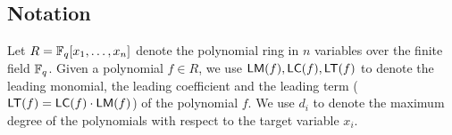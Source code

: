 
\subsection{Notation}

Let \(R = \mathbb{F}_q[x_1, \dots, x_n]\) denote the polynomial ring in \(n\) variables over the finite field \(\mathbb{F}_q\). Given a polynomial \(f \in R\), we use \(\mathsf{LM}(f), \mathsf{LC}(f), \mathsf{LT}(f)\) to denote the leading monomial, the leading coefficient and the leading term (\(\mathsf{LT}(f) = \mathsf{LC}(f)\cdot \mathsf{LM}(f)\)) of the polynomial \(f\). We use $d_i$ to denote the maximum degree of the polynomials with respect to the target variable $x_i$. 

